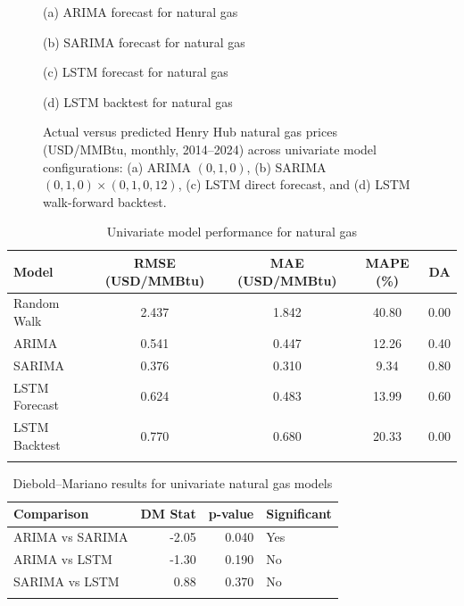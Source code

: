 \documentclass[pdflatex,sn-mathphys-num]{sn-jnl}%
\theoremstyle{thmstyleone}%
\theoremstyle{thmstyletwo}%
\theoremstyle{thmstylethree}%
\begin{document}
\begin{figure}[h]
\centering
\begin{minipage}[t]{0.495\textwidth}
\centering

\small (a) ARIMA forecast for natural gas
\end{minipage}\hfill
\begin{minipage}[t]{0.495\textwidth}
\centering

\small (b) SARIMA forecast for natural gas
\end{minipage}

\vspace{0.5em}

\begin{minipage}[t]{0.495\textwidth}
\centering

\small (c) LSTM forecast for natural gas
\end{minipage}\hfill
\begin{minipage}[t]{0.495\textwidth}
\centering

\small (d) LSTM backtest for natural gas
\end{minipage}
\caption{Actual versus predicted Henry Hub natural gas prices (USD/MMBtu, monthly, 2014--2024) across univariate model configurations: (a) ARIMA $(0,1,0)$, (b) SARIMA $(0,1,0) \times (0,1,0,12)$, (c) LSTM direct forecast, and (d) LSTM walk-forward backtest.}
\label{fig:univariate_gas_plots}
\end{figure}

\begin{table}[h]
\centering
\caption{Univariate model performance for natural gas}
\label{tab:univariate_gas}
\begin{tabular}{@{}lcccc@{}}
\toprule
Model & RMSE (USD/MMBtu) & MAE (USD/MMBtu) & MAPE (\%) & DA \\
\midrule
Random Walk & 2.437 & 1.842 & 40.80 & 0.00 \\
ARIMA & 0.541 & 0.447 & 12.26 & 0.40 \\
SARIMA & 0.376 & 0.310 & 9.34 & 0.80 \\
LSTM Forecast & 0.624 & 0.483 & 13.99 & 0.60 \\
LSTM Backtest & 0.770 & 0.680 & 20.33 & 0.00 \\
\botrule
\end{tabular}
\end{table}

\begin{table}[h]
\centering
\small
\caption{Diebold--Mariano results for univariate natural gas models}
\label{tab:dm_univariate_cng}
\begin{tabular}{@{}lrrl@{}}
\toprule
Comparison & DM Stat & p-value & Significant \\
\midrule
ARIMA vs SARIMA & -2.05 & 0.040 & Yes \\
ARIMA vs LSTM & -1.30 & 0.190 & No \\
SARIMA vs LSTM & 0.88 & 0.370 & No \\
\botrule
\end{tabular}
\end{table}
\end{document}
